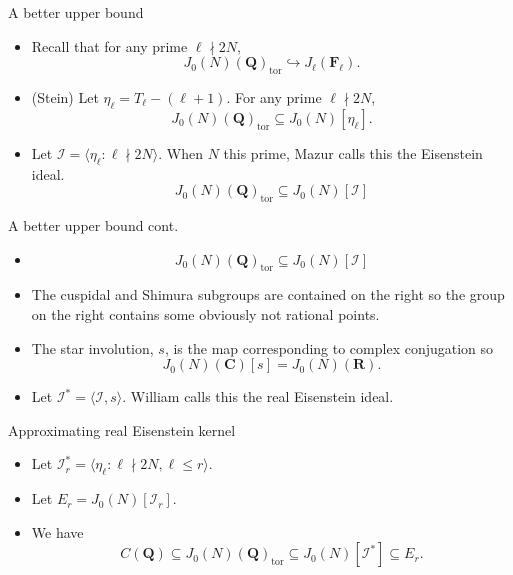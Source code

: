 \documentclass{beamer}
\newcommand{\QQ}{\mathbf{Q}}
\newcommand{\RR}{\mathbf{R}}
\newcommand{\F}{\mathbf{F}}
\newcommand{\I}{\mathcal{I}}
\newcommand{\CC}{\mathbf{C}}
\newcommand{\tor}{\mathrm{tor}}
\begin{document}
\begin{frame}{A better upper bound}
    \begin{itemize}
        \item 
            Recall that for any prime $\ell\nmid 2N$,
            \[
                J_0(N)(\QQ)_\tor\hookrightarrow J_\ell(\F_\ell).
            \]
        \item
            (Stein) Let $\eta_\ell = T_\ell - (\ell+1)$. For any prime
            $\ell\nmid 2N$,
            \[
                J_0(N)(\QQ)_\tor\subseteq J_0(N)[\eta_\ell].
            \]
        \item
            Let $\mathcal{I} = \langle \eta_\ell:\ell\nmid 2N\rangle$. When $N$
            this prime, Mazur calls this the Eisenstein ideal.
            \[
                J_0(N)(\QQ)_\tor \subseteq J_0(N)[\I]
            \]
    \end{itemize} 
\end{frame}

\begin{frame}{A better upper bound cont.}
    \begin{itemize}
        \item
            \[
                J_0(N)(\QQ)_\tor \subseteq J_0(N)[\I]
            \]
        \item
            The cuspidal and Shimura subgroups are contained on the right so
            the group on the right contains some obviously not rational points.
        \item
            The star involution, $s$, is the map corresponding to complex
            conjugation so
            \[
                J_0(N)(\CC)[s] = J_0(N)(\RR).
            \]
        \item
            Let $\I^* = \langle \I, s \rangle$. William calls this the real
            Eisenstein ideal.
   \end{itemize} 
\end{frame}

\begin{frame}{Approximating real Eisenstein kernel}
    \begin{itemize}
        \item
            Let $\I_r ^*= \langle \eta_\ell:\ell\nmid 2N, \ell \leq r \rangle$.
        \item
            Let $E_r = J_0(N)[\I_r]$.
        \item 
            We have
            \[
                C(\QQ)\subseteq J_0(N)(\QQ)_\tor \subseteq J_0(N)[\I^*]
                \subseteq E_r.
            \]
    \end{itemize}
\end{frame}
\end{document}
